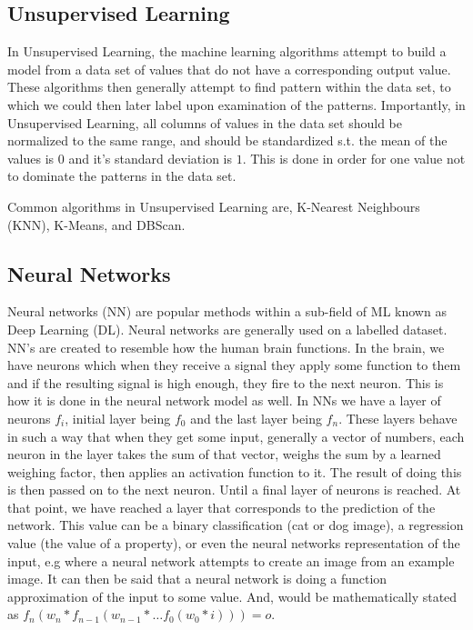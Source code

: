 \subsection{Unsupervised Learning}

In Unsupervised Learning, the machine learning algorithms attempt to build a model from a data set of values that do not have a corresponding output value. These algorithms then generally attempt to find pattern within the data set, to which we could then later label upon examination of the patterns. Importantly, in Unsupervised Learning, all columns of values in the data set should be normalized to the same range, and should be standardized s.t. the mean of the values is $0$ and it's standard deviation is $1$. This is done in order for one value not to dominate the patterns in the data set.

Common algorithms in Unsupervised Learning are, K-Nearest Neighbours (KNN), K-Means\cite{lloyd:kmeans}, and DBScan\cite{ling:dbscan}.

\subsection{Neural Networks}

Neural networks (NN) are popular methods within a sub-field of ML known as Deep Learning (DL). Neural networks are generally used on a labelled dataset. NN's are created to resemble how the human brain functions. In the brain, we have neurons which when they receive a signal they apply some function to them and if the resulting signal is high enough, they fire to the next neuron. This is how it is done in the neural network model as well. In NNs we have a layer of neurons $f_i$, initial layer being $f_0$ and the last layer being $f_n$. These layers behave in such a way that when they get some input, generally a vector of numbers, each neuron in the layer takes the sum of that vector, weighs the sum by a learned weighing factor, then applies an activation function to it. The result of doing this is then passed on to the next neuron. Until a final layer of neurons is reached. At that point, we have reached a layer that corresponds to the prediction of the network. This value can be a binary classification (cat or dog image), a regression value (the value of a property), or even the neural networks representation of the input, e.g where a neural network attempts to create an image from an example image\cite{karras:stylegan}. It can then be said that a neural network is doing a function approximation of the input to some value. And, would be mathematically stated as $f_n ( w_n * f_{n-1} (w_{n-1} * \dots f_0(w_0*i))) = o$.

